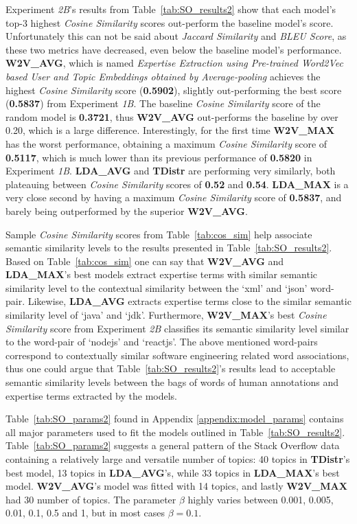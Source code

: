             Experiment \emph{2B}'s results from Table~\ref{tab:SO_results2} show that each model's top-$3$ highest \emph{Cosine Similarity} scores out-perform the baseline model's score. Unfortunately this can not be said about \emph{Jaccard Similarity} and \emph{BLEU Score}, as these two metrics have decreased, even below the baseline model's performance. \textbf{W2V\_AVG}, which is named \emph{Expertise Extraction using Pre-trained Word2Vec based User and Topic Embeddings obtained by Average-pooling} achieves the highest \emph{Cosine Similarity} score (\textbf{0.5902}), slightly out-performing the best score (\textbf{0.5837}) from Experiment \emph{1B}. The baseline \emph{Cosine Similarity} score of the random model is \textbf{0.3721}, thus \textbf{W2V\_AVG} out-performs the baseline by over 0.20, which is a large difference. Interestingly, for the first time \textbf{W2V\_MAX} has the worst performance, obtaining a maximum \emph{Cosine Similarity} score of \textbf{0.5117}, which is much lower than its previous performance of \textbf{0.5820} in Experiment \emph{1B}. \textbf{LDA\_AVG} and \textbf{TDistr} are performing very similarly, both plateauing between \emph{Cosine Similarity} scores of \textbf{0.52} and \textbf{0.54}. \textbf{LDA\_MAX} is a very close second by having a maximum \emph{Cosine Similarity} score of \textbf{0.5837}, and barely being outperformed by the superior \textbf{W2V\_AVG}.
            
            Sample \emph{Cosine Similarity} scores from Table~\ref{tab:cos_sim} help associate semantic similarity levels to the results presented in Table~\ref{tab:SO_results2}. Based on Table~\ref{tab:cos_sim} one can say that \textbf{W2V\_AVG} and \textbf{LDA\_MAX}'s best models extract expertise terms with similar semantic similarity level to the contextual similarity between the `xml' and `json' word-pair. Likewise, \textbf{LDA\_AVG} extracts expertise terms close to the similar semantic similarity level of `java' and `jdk'. Furthermore, \textbf{W2V\_MAX}'s best \emph{Cosine Similarity} score from Experiment \emph{2B} classifies its semantic similarity level similar to the word-pair of `nodejs' and `reactjs'. The above mentioned word-pairs correspond to contextually similar software engineering related word associations, thus one could argue that Table~\ref{tab:SO_results2}'s results lead to acceptable semantic similarity levels between the bags of words of human annotations and expertise terms extracted by the models.
            
            Table~\ref{tab:SO_params2} found in Appendix \ref{appendix:model_params} contains all major parameters used to fit the models outlined in Table~\ref{tab:SO_results2}. Table~\ref{tab:SO_params2} suggests a general pattern of the Stack Overflow data containing a relatively large and versatile number of topics: 40 topics in \textbf{TDistr}'s best model, 13 topics in \textbf{LDA\_AVG}'s, while 33 topics in \textbf{LDA\_MAX}'s best model. \textbf{W2V\_AVG}'s model was fitted with 14 topics, and lastly  \textbf{W2V\_MAX} had 30 number of topics. The parameter $\beta$ highly varies between 0.001, 0.005, 0.01, 0.1, 0.5 and 1, but in most cases $\beta=0.1$.
            
